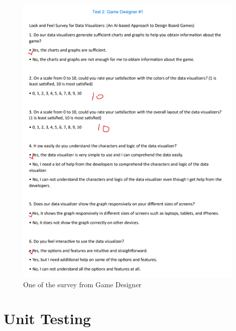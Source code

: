 \documentclass[12pt, titlepage]{article}
\begin{document}
\begin{figure}[!ht]
    \centering
    \includegraphics{gd1.png}
    \caption{One of the survey from Game Designer}
    \label{One of the survey from Game Designer}
\end{figure}

\clearpage
\section{Unit Testing}
\end{document}
